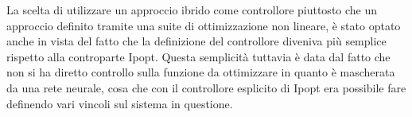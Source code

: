 La scelta di utilizzare un approccio ibrido come controllore piuttosto che un approccio definito tramite una suite
di ottimizzazione non lineare, è stato optato anche in vista del fatto che la definizione del controllore diveniva 
più semplice rispetto alla controparte Ipopt. Questa semplicità tuttavia è data dal fatto che non si ha diretto 
controllo sulla funzione da ottimizzare in quanto è mascherata da una rete neurale, cosa che con il controllore 
esplicito di Ipopt era possibile fare definendo vari vincoli sul sistema in questione.
